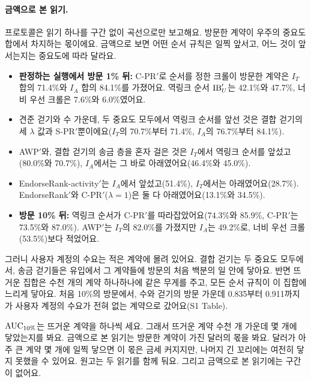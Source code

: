 \paragraph{금액으로 본 읽기.}
프로토콜은 읽기 하나를 구간 없이 곡선으로만 보고해요. 방문한 계약이 우주의 중요도 합에서 차지하는 몫이에요. 금액으로 보면 어떤 순서 규칙은 일찍 앞서고, 어느 것이 앞서는지는 중요도에 따라 달라요.
\begin{itemize}
\item \textbf{판정하는 실행에서 방문 1\% 뒤:} C-PR$'$로 순서를 정한 크롤이 방문한 계약은 $I_T$ 합의 71.4\%와 $I_A$ 합의 84.1\%를 가졌어요. 역링크 순서 $\mathrm{IB}'_U$는 42.1\%와 47.7\%, 너비 우선 크롤은 7.6\%와 6.0\%였어요.
\item 견준 걷기와 수 가운데, 두 중요도 모두에서 역링크 순서를 앞선 것은 결합 걷기의 세 $\lambda$ 값과 S-PR$'$뿐이에요($I_T$의 70.7\%부터 71.4\%, $I_A$의 76.7\%부터 84.1\%).
\item AWP$'$와, 결합 걷기의 송금 층을 혼자 걸은 것은 $I_T$에서 역링크 순서를 앞섰고(80.0\%와 70.7\%), $I_A$에서는 그 바로 아래였어요(46.4\%와 45.0\%).
\item EndorseRank-activity$'$는 $I_A$에서 앞섰고(51.4\%), $I_T$에서는 아래였어요(28.7\%). EndorseRank$'$와 C-PR$'$($\lambda{=}1$)은 둘 다 아래였어요(13.1\%와 34.5\%).
\item \textbf{방문 10\% 뒤:} 역링크 순서가 C-PR$'$를 따라잡았어요(74.3\%와 85.9\%, C-PR$'$는 73.5\%와 87.0\%). AWP$'$는 $I_T$의 82.0\%를 가졌지만 $I_A$는 49.2\%로, 너비 우선 크롤(53.5\%)보다 적었어요.
\end{itemize}
그러니 사용자 계정의 수요는 적은 계약에 몰려 있어요. 결합 걷기는 두 중요도 모두에서, 송금 걷기들은 유입에서 그 계약들에 방문의 처음 백분의 일 안에 닿아요. 반면 뜨거운 집합은 수천 개의 계약 하나하나에 같은 무게를 주고, 모든 순서 규칙이 이 집합에 느리게 닿아요. 처음 10\%의 방문에서, 수와 걷기의 방문 가운데 0.835부터 0.911까지가 사용자 계정의 수요가 전혀 없는 계약으로 갔어요(S1 Table).

\begin{puri}
$\mathrm{AUC}_{10\%}$는 뜨거운 계약을 하나씩 세요. 그래서 뜨거운 계약 수천 개 가운데 몇 개에 닿았는지를 봐요. 금액으로 본 읽기는 방문한 계약이 가진 달러의 몫을 봐요. 달러가 아주 큰 계약 몇 개에 일찍 닿으면 이 몫은 금세 커지지만, 나머지 긴 꼬리에는 여전히 닿지 못했을 수 있어요. 원고는 두 읽기를 함께 둬요. 그리고 금액으로 본 읽기에는 구간이 없어요.
\end{puri}

